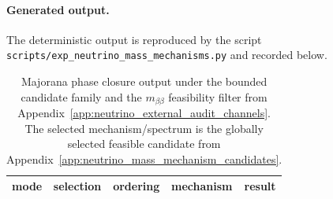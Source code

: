 \paragraph{Generated output.}
\AuditTag The deterministic output is reproduced by the script \texttt{scripts/exp\_neutrino\_mass\_mechanisms.py} and recorded below.

%

\begin{table}[t]
\centering
\scriptsize
\setlength{\tabcolsep}{6pt}
\renewcommand{\arraystretch}{1.15}
\begin{tabular}{lllll}
\toprule
mode & selection & ordering & mechanism & result \\
\midrule
%
\end{tabular}
\caption{Majorana phase closure output under the bounded candidate family and the $m_{\beta\beta}$ feasibility filter from Appendix~\ref{app:neutrino_external_audit_channels}. The selected mechanism/spectrum is the globally selected feasible candidate from Appendix~\ref{app:neutrino_mass_mechanism_candidates}.}
\label{tab:neutrino_majorana_phase_closure}
\end{table}

